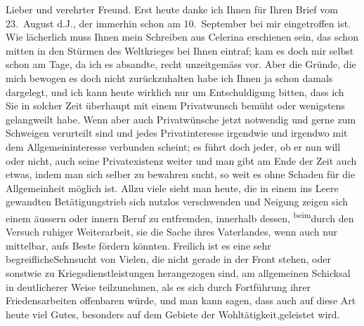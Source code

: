 \pstart\center{}Lieber und verehrter Freund.\pend\vspace{0.5em}
\pstart
           Erst heute danke ich Ihnen für Ihren Brief vom 23. August d.J., der
               immerhin schon am 10. September bei mir eingetroffen ist. Wie lächerlich
               muss Ihnen mein Schreiben aus Celerina
               erschienen sein, das schon mitten in den Stürmen des Weltkrieges bei Ihnen eintraf;
               kam es doch mir selbst schon am Tage, da ich es absandte, recht unzeitgemäss vor.
               Aber die Gründe, die mich bewogen es doch nicht zurückzuhalten habe ich Ihnen ja  schon damals dargelegt\introOben{},\introOben{}
               und ich kann heute wirklich nur um Entschuldigung bitten, dass ich Sie in solcher
               Zeit überhaupt mit einem Privatwunsch bemüht oder wenigstens gelangweilt habe. Wenn
               aber auch Privatwünsche jetzt notwendig und gerne zum Schweigen verurteilt sind und
               jedes Privatinteresse irgendwie und irgendwo mit dem Allgemeininteresse verbunden
               scheint; es führt {\pb}doch jeder, ob er nun will oder
               nicht, auch seine Privatexistenz weiter und man gibt am Ende der Zeit auch etwas,
               indem man sich selber zu bewahren sucht, so weit es ohne Schaden für die
               Allgemeinheit möglich ist. Allzu viele sieht man heute, die in einem ins Leere
               gewandten Betätigungstrieb sich nutzlos verschwenden und Neigung zeigen sich einem
               äussern oder innern Beruf zu entfremden, innerhalb dessen, \substVorne{}\textsuperscript{beim}\substDazwischen{}durch den\substHinten{} Versuch ruhiger Weiterarbeit, sie die Sache ihres Vaterlandes, wenn auch nur
               mittelbar, aufs Beste fördern könnten. Freilich ist \introOben{}es eine sehr
                  begreifliche\introOben{}Sehnsucht von Vielen, die nicht gerade in der Front
               stehen, oder sonstwie zu Kriegsdienstleistungen herangezogen sind, am allgemeinen
               Schicksal in deutlicherer Weise teilzunehmen, als es sich durch Fortführung ihrer
               Friedensarbeiten offenbaren würde, und man kann sagen, dass auch auf diese Art heute
               viel Gutes, besonders auf dem Gebiete der Wohltätigkeit,geleistet wird.\pend
           
